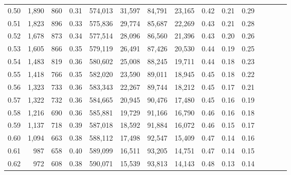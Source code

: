 \begin{tabular}{rrrcrrrrrrrrrrr}
0.50 &   1,890 &    860 &                                       0.31 &  574,013 &   31,597 &   84,791 &   23,165 &  0.42 &  0.21 &                         0.29 \\
0.51 &   1,823 &    896 &                                       0.33 &  575,836 &   29,774 &   85,687 &   22,269 &  0.43 &  0.21 &                         0.28 \\
0.52 &   1,678 &    873 &                                       0.34 &  577,514 &   28,096 &   86,560 &   21,396 &  0.43 &  0.20 &                         0.26 \\
0.53 &   1,605 &    866 &                                       0.35 &  579,119 &   26,491 &   87,426 &   20,530 &  0.44 &  0.19 &                         0.25 \\
0.54 &   1,483 &    819 &                                       0.36 &  580,602 &   25,008 &   88,245 &   19,711 &  0.44 &  0.18 &                         0.23 \\
0.55 &   1,418 &    766 &                                       0.35 &  582,020 &   23,590 &   89,011 &   18,945 &  0.45 &  0.18 &                         0.22 \\
0.56 &   1,323 &    733 &                                       0.36 &  583,343 &   22,267 &   89,744 &   18,212 &  0.45 &  0.17 &                         0.21 \\
0.57 &   1,322 &    732 &                                       0.36 &  584,665 &   20,945 &   90,476 &   17,480 &  0.45 &  0.16 &                         0.19 \\
0.58 &   1,216 &    690 &                                       0.36 &  585,881 &   19,729 &   91,166 &   16,790 &  0.46 &  0.16 &                         0.18 \\
0.59 &   1,137 &    718 &                                       0.39 &  587,018 &   18,592 &   91,884 &   16,072 &  0.46 &  0.15 &                         0.17 \\
0.60 &   1,094 &    663 &                                       0.38 &  588,112 &   17,498 &   92,547 &   15,409 &  0.47 &  0.14 &                         0.16 \\
0.61 &     987 &    658 &                                       0.40 &  589,099 &   16,511 &   93,205 &   14,751 &  0.47 &  0.14 &                         0.15 \\
0.62 &     972 &    608 &                                       0.38 &  590,071 &   15,539 &   93,813 &   14,143 &  0.48 &  0.13 &                         0.14 \\

\end{tabular}
